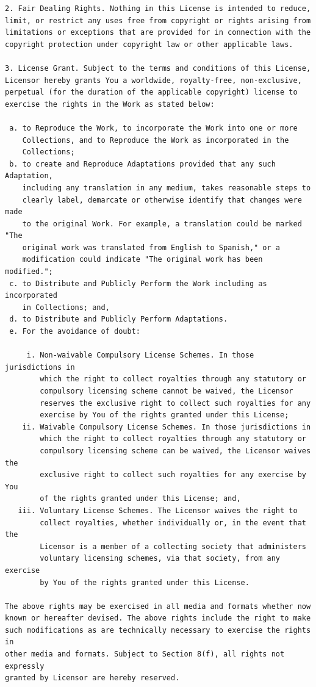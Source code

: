 \documentclass[10pt]{book}              %
\begin{document}
\begin{appendices}
\begin{verbatim}
2. Fair Dealing Rights. Nothing in this License is intended to reduce,
limit, or restrict any uses free from copyright or rights arising from
limitations or exceptions that are provided for in connection with the
copyright protection under copyright law or other applicable laws.

3. License Grant. Subject to the terms and conditions of this License,
Licensor hereby grants You a worldwide, royalty-free, non-exclusive,
perpetual (for the duration of the applicable copyright) license to
exercise the rights in the Work as stated below:

 a. to Reproduce the Work, to incorporate the Work into one or more
    Collections, and to Reproduce the Work as incorporated in the
    Collections;
 b. to create and Reproduce Adaptations provided that any such Adaptation,
    including any translation in any medium, takes reasonable steps to
    clearly label, demarcate or otherwise identify that changes were made
    to the original Work. For example, a translation could be marked "The
    original work was translated from English to Spanish," or a
    modification could indicate "The original work has been modified.";
 c. to Distribute and Publicly Perform the Work including as incorporated
    in Collections; and,
 d. to Distribute and Publicly Perform Adaptations.
 e. For the avoidance of doubt:

     i. Non-waivable Compulsory License Schemes. In those jurisdictions in
        which the right to collect royalties through any statutory or
        compulsory licensing scheme cannot be waived, the Licensor
        reserves the exclusive right to collect such royalties for any
        exercise by You of the rights granted under this License;
    ii. Waivable Compulsory License Schemes. In those jurisdictions in
        which the right to collect royalties through any statutory or
        compulsory licensing scheme can be waived, the Licensor waives the
        exclusive right to collect such royalties for any exercise by You
        of the rights granted under this License; and,
   iii. Voluntary License Schemes. The Licensor waives the right to
        collect royalties, whether individually or, in the event that the
        Licensor is a member of a collecting society that administers
        voluntary licensing schemes, via that society, from any exercise
        by You of the rights granted under this License.

The above rights may be exercised in all media and formats whether now
known or hereafter devised. The above rights include the right to make
such modifications as are technically necessary to exercise the rights in
other media and formats. Subject to Section 8(f), all rights not expressly
granted by Licensor are hereby reserved.


\end{verbatim}
\end{appendices}
\end{document}
